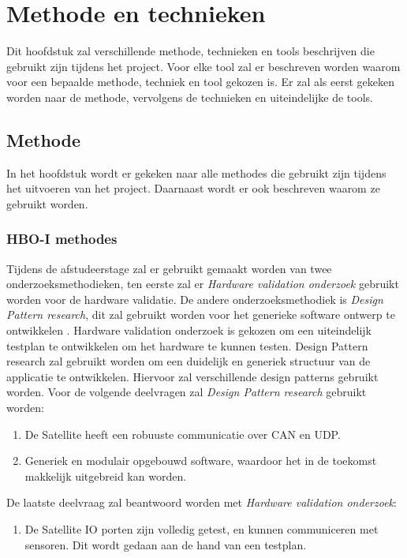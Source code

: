 \chapter{Methode en technieken}
Dit hoofdstuk zal verschillende methode, technieken en tools beschrijven die gebruikt zijn tijdens het project. Voor elke tool zal er beschreven worden waarom voor een bepaalde methode, techniek en tool gekozen is. Er zal als eerst gekeken worden naar de methode, vervolgens de technieken en uiteindelijke de tools.

\section{Methode}
In het hoofdstuk wordt er gekeken naar alle methodes die gebruikt zijn tijdens het uitvoeren van het project. Daarnaast wordt er ook beschreven waarom ze gebruikt worden.

\subsection{HBO-I methodes}
Tijdens de afstudeerstage zal er gebruikt gemaakt worden van twee onderzoeksmethodieken, ten eerste zal er \textit{Hardware validation onderzoek} gebruikt worden voor de hardware validatie. De andere onderzoeksmethodiek is \textit{Design Pattern research}, dit zal gebruikt worden voor het generieke software ontwerp te ontwikkelen \parencite{researchmethods}. Hardware validation onderzoek is gekozen om een uiteindelijk testplan te ontwikkelen om het hardware te kunnen testen. Design Pattern research zal gebruikt worden om een duidelijk en generiek structuur van de applicatie te ontwikkelen. Hiervoor zal verschillende design patterns gebruikt worden. Voor de volgende deelvragen zal \textit{Design Pattern research} gebruikt worden: 
\begin{enumerate}
	\item De Satellite heeft een robuuste communicatie over CAN en UDP.
	\item Generiek en modulair opgebouwd software, waardoor het in de toekomst makkelijk uitgebreid kan worden.
\end{enumerate}

\noindent De laatste deelvraag zal beantwoord worden met \textit{Hardware validation onderzoek}:
\begin{enumerate}
	\item De Satellite IO porten zijn volledig getest, en kunnen communiceren met sensoren. Dit wordt gedaan aan de hand van een testplan.
\end{enumerate}

